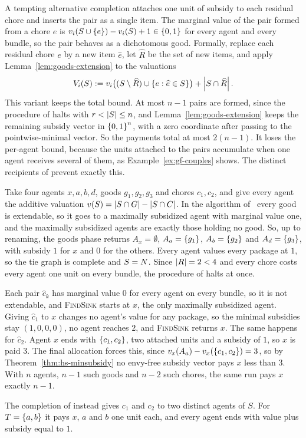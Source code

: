 \begin{remark}
\label{rem:gf-couples}
A tempting alternative completion attaches one unit of subsidy to each residual
chore and inserts the pair as a single item. The marginal value of the pair formed
from a chore $e$ is $v_i(S\cup\left\{e\right\})-v_i(S)+1\in\left\{0,1\right\}$ for every agent and
every bundle, so the pair behaves as a dichotomous good. Formally, replace each
residual chore $e$ by a new item $\widehat e$, let $\widehat R$ be the set of new
items, and apply Lemma~\ref{lem:goods-extension} to the valuations
\[
  V_i(S):=v_i\bigl((S\setminus\widehat R)\cup\left\{e:\widehat e\in S\right\}\bigr)
  +\left\lvert S\cap\widehat R\right\rvert.
\]
This variant keeps the total bound. At most $n-1$ pairs are formed, since the
procedure of  halts with $r<\left\lvert S\right\rvert\le n$, and
Lemma~\ref{lem:goods-extension} keeps the remaining subsidy vector in
$\left\{0,1\right\}^n$, with a zero coordinate after passing to the pointwise-minimal
vector. So the payments total at most $2(n-1)$. It loses the per-agent bound,
because the units attached to the pairs accumulate when one agent receives
several of them, as Example~\ref{ex:gf-couples} shows. The distinct recipients
of  prevent exactly this.
\end{remark}

\begin{example}
\label{ex:gf-couples}
Take four agents $x,a,b,d$, goods $g_1,g_2,g_3$ and chores $c_1,c_2$, and give
every agent the additive valuation $v(S)=\left\lvert S\cap G\right\rvert-\left\lvert S\cap C\right\rvert$. In the
algorithm of~\cite{BKNS22} every good is extendable, so it goes to a maximally
subsidized agent with marginal value one, and the maximally subsidized agents are
exactly those holding no good. So, up to renaming, the goods phase returns
$A_x=\emptyset$, $A_a=\left\{g_1\right\}$, $A_b=\left\{g_2\right\}$ and $A_d=\left\{g_3\right\}$, with
subsidy $1$ for $x$ and $0$ for the others. Every agent values every package at
$1$, so the tie graph is complete and $S=N$. Since $\left\lvert R\right\rvert=2<4$ and every
chore costs every agent one unit on every bundle, the procedure of
 halts at once.

Each pair $\widehat c_k$ has marginal value $0$ for every agent on every bundle,
so it is not extendable, and \textsc{FindSink} starts at $x$, the only maximally
subsidized agent. Giving $\widehat c_1$ to $x$ changes no agent's value for any
package, so the minimal subsidies stay $(1,0,0,0)$, no agent reaches $2$, and
\textsc{FindSink} returns $x$. The same happens for $\widehat c_2$. Agent $x$
ends with $\left\{c_1,c_2\right\}$, two attached units and a subsidy of $1$, so $x$ is paid
$3$. The final allocation forces this, since $v_x(A_a)-v_x(\left\{c_1,c_2\right\})=3$, so
by Theorem~\ref{thm:hs-minsubsidy} no envy-free subsidy vector pays $x$ less than
$3$. With $n$ agents, $n-1$ such goods and $n-2$ such chores, the same run pays
$x$ exactly $n-1$.

The completion of  instead gives $c_1$ and $c_2$ to two
distinct agents of $S$. For $T=\left\{a,b\right\}$ it pays $x$, $a$ and $b$ one unit each,
and every agent ends with value plus subsidy equal to $1$.
\end{example}

